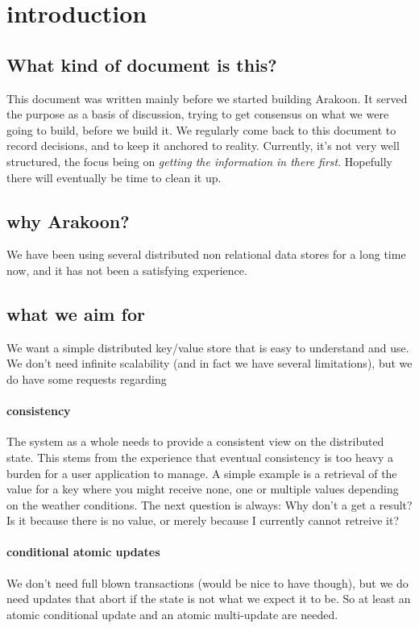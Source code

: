 \section{introduction}
\subsection{What kind of document is this?}
This document was written mainly before we started building Arakoon. 
It served the purpose as a basis of discussion, 
trying to get consensus on what we were going to build, before we build it. 
We regularly come back to this document to record decisions, and to keep it anchored to reality. Currently, it's not very well structured, the focus being on \emph{getting the information in there first}. 
Hopefully there will eventually be time to clean it up.
\subsection{why Arakoon?}
We have been using several distributed non relational data stores for a long time now, and it has not been a satisfying experience.
\subsection{what we aim for}
We want a simple distributed key/value store that is easy to understand and use.
We don't need infinite scalability (and in fact we have several limitations), but we do have some requests regarding
\paragraph{consistency}
The system as a whole needs to provide a consistent view on the distributed state.
This stems from the experience that eventual consistency is too heavy a burden for a user application to manage. 
A simple example is a retrieval of the value for a key where you might receive none, one or multiple values depending on the weather conditions. The next question is always: Why don't a get a result? Is it because there is no value, or merely because I currently cannot retreive it?

\paragraph{conditional atomic updates}
We don't need full blown transactions (would be nice to have though), 
but we do need updates that abort if the state is not what we expect it to be.
So at least an atomic conditional update and an atomic multi-update are needed.
